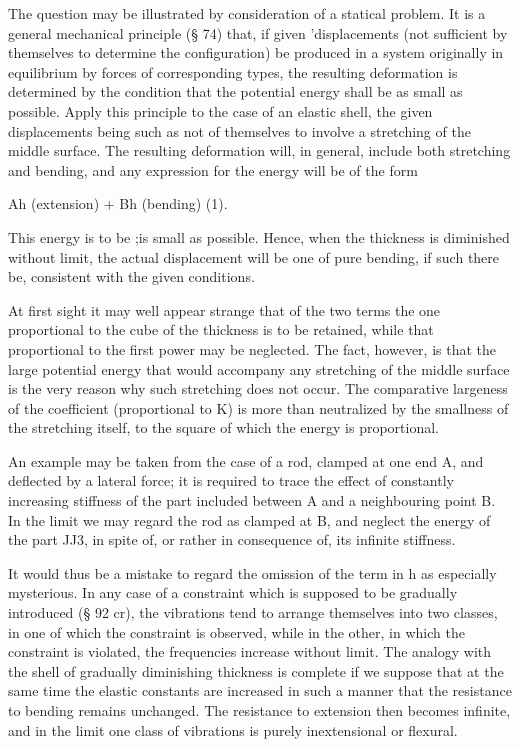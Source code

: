 The question may be illustrated by consideration of a statical problem. It is a
general mechanical principle (§ 74) that, if given 'displacements (not
sufficient by themselves to determine the configuration) be produced in a
system originally in equilibrium by forces of corresponding types, the
resulting deformation is determined by the condition that the potential energy
shall be as small as possible. Apply this principle to the case of an elastic
shell, the given displacements being such as not of themselves to involve a
stretching of the middle surface. The resulting deformation will, in general,
include both stretching and bending, and any expression for the energy will be
of the form

Ah (extension) + Bh (bending) (1).

This energy is to be ;is small as possible. Hence, when the thickness is
diminished without limit, the actual displacement will be one of pure bending,
if such there be, consistent with the given conditions.

At first sight it may well appear strange that of the two terms the one
proportional to the cube of the thickness is to be retained, while that
proportional to the first power may be neglected. The fact, however, is that
the large potential energy that would accompany any stretching of the middle
surface is the very reason why such stretching does not occur. The comparative
largeness of the coefficient (proportional to K) is more than neutralized by
the smallness of the stretching itself, to the square of which the energy is
proportional.

An example may be taken from the case of a rod, clamped at one end A, and
deflected by a lateral force; it is required to trace the effect of constantly
increasing stiffness of the part included between A and a neighbouring point B.
In the limit we may regard the rod as clamped at B, and neglect the energy of
the part JJ3, in spite of, or rather in consequence of, its infinite stiffness.

It would thus be a mistake to regard the omission of the term in h as
especially mysterious. In any case of a constraint which is supposed to be
gradually introduced (§ 92 cr), the vibrations tend to arrange themselves into
two classes, in one of which the constraint is observed, while in the other, in
which the constraint is violated, the frequencies increase without limit. The
analogy with the shell of gradually diminishing thickness is complete if we
suppose that at the same time the elastic constants are increased in such a
manner that the resistance to bending remains unchanged. The resistance to
extension then becomes infinite, and in the limit one class of vibrations is
purely inextensional or flexural.

